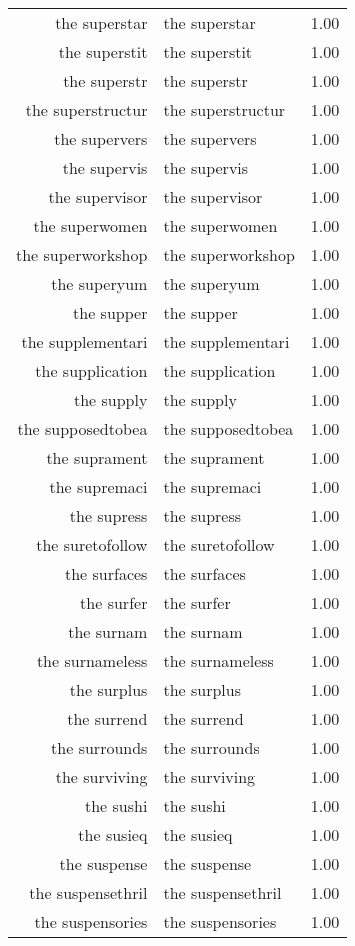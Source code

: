 \begin{table}[ht]
\begin{tabular}{rlr}
  the superstar & the superstar & 1.00 \\ 
  the superstit & the superstit & 1.00 \\ 
  the superstr & the superstr & 1.00 \\ 
  the superstructur & the superstructur & 1.00 \\ 
  the supervers & the supervers & 1.00 \\ 
  the supervis & the supervis & 1.00 \\ 
  the supervisor & the supervisor & 1.00 \\ 
  the superwomen & the superwomen & 1.00 \\ 
  the superworkshop & the superworkshop & 1.00 \\ 
  the superyum & the superyum & 1.00 \\ 
  the supper & the supper & 1.00 \\ 
  the supplementari & the supplementari & 1.00 \\ 
  the supplication & the supplication & 1.00 \\ 
  the supply & the supply & 1.00 \\ 
  the supposedtobea & the supposedtobea & 1.00 \\ 
  the suprament & the suprament & 1.00 \\ 
  the supremaci & the supremaci & 1.00 \\ 
  the supress & the supress & 1.00 \\ 
  the suretofollow & the suretofollow & 1.00 \\ 
  the surfaces & the surfaces & 1.00 \\ 
  the surfer & the surfer & 1.00 \\ 
  the surnam & the surnam & 1.00 \\ 
  the surnameless & the surnameless & 1.00 \\ 
  the surplus & the surplus & 1.00 \\ 
  the surrend & the surrend & 1.00 \\ 
  the surrounds & the surrounds & 1.00 \\ 
  the surviving & the surviving & 1.00 \\ 
  the sushi & the sushi & 1.00 \\ 
  the susieq & the susieq & 1.00 \\ 
  the suspense & the suspense & 1.00 \\ 
  the suspensethril & the suspensethril & 1.00 \\ 
  the suspensories & the suspensories & 1.00 \\ 

\end{tabular}
\end{table}
